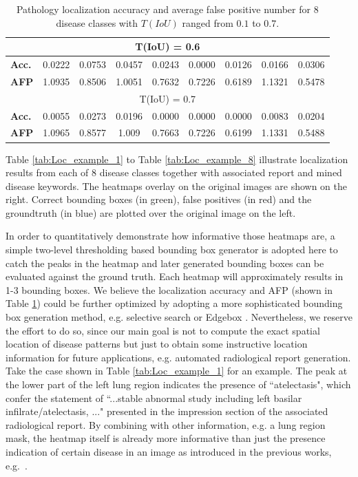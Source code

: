 \documentclass[10pt,twocolumn,letterpaper]{article}
\begin{document}
\begin{table}[t]
\begin{center}
\begin{tabular}{|p{6.5em}||c|c|c|c|c|c|c|c|}
			\hline
			\multicolumn{9}{|c|}{T(IoU) = 0.6}\\
			\hline		
			{\bf Acc.}   &0.0222&0.0753&0.0457&0.0243&0.0000&0.0126&0.0166&0.0306\\
			\hline
			{\bf AFP}   & 1.0935&0.8506&1.0051&0.7632&0.7226&0.6189&1.1321&0.5478\\
			\hline
			\multicolumn{9}{|c|}{T(IoU) = 0.7} \\
			\hline
			{\bf Acc.}   &0.0055&0.0273&0.0196&0.0000&0.0000&0.0000&0.0083&0.0204\\
			\hline
			{\bf AFP}   & 1.0965&0.8577&1.009&0.7663&0.7226&0.6199&1.1331&0.5488\\
			\hline
		\end{tabular}
	\end{center}
	\caption{Pathology localization accuracy and average false positive number for 8 disease classes with $T(IoU)$ ranged from $0.1$ to $0.7$.}
	\label{tab:IoU}
\end{table}

Table \ref{tab:Loc_example_1} to Table \ref{tab:Loc_example_8} illustrate localization results from each of 8 disease classes together with associated report and mined disease keywords. The heatmaps overlay on the original images are shown on the right. Correct bounding boxes (in green), false positives (in red) and the groundtruth (in blue) are plotted over the original image on the left.

In order to quantitatively demonstrate how informative those heatmaps are, a simple two-level thresholding based bounding box generator is adopted here to catch the peaks in the heatmap and later generated bounding boxes can be evaluated against the ground truth. Each heatmap will approximately results in 1-3 bounding boxes. We believe the localization accuracy and AFP (shown in Table \ref{tab:IoU}) could be further optimized by adopting a more sophisticated bounding box generation method, e.g. selective search \cite{uijlings2013selective} or Edgebox \cite{hosang2016makes}. Nevertheless, we reserve the effort to do so, since our main goal is not to compute the exact spatial location of disease patterns but just to obtain some instructive location information for future applications, e.g. automated radiological report generation. Take the case shown in Table \ref{tab:Loc_example_1} for an example. The peak at the lower part of the left lung region indicates the presence of ``atelectasis", which confer the statement of ``...stable abnormal study including left basilar infilrate/atelectasis, ..." presented in the impression section of the associated radiological report. By combining with other information, e.g. a lung region mask, the heatmap itself is already more informative than just the presence indication of certain disease in an image as introduced in the previous works, e.g.~\cite{Shin2016Learning}.   
\end{document}

